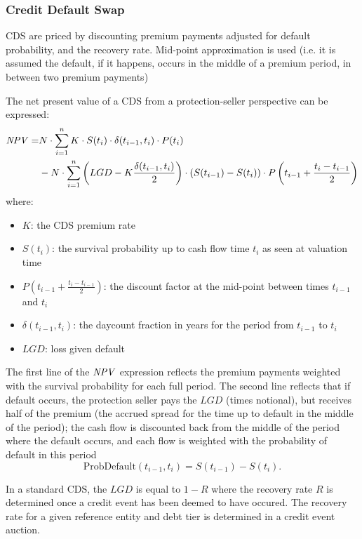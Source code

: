 \subsubsection{Credit Default Swap}
\label{pricing:cr_cds}

CDS are priced by discounting premium payments adjusted for default probability, 
and the recovery rate. Mid-point approximation is used (i.e. it is assumed the 
default, if it happens, occurs in the middle of a premium period, in between 
two premium payments)

The net present value of a CDS from a protection-seller perspective can be 
expressed:
\begin{align*}
\mathit{NPV}=& N \cdot\sum_{i=1}^n K\cdot S(t_i)\cdot\delta(t_{i-1},t_i)\cdot P(t_i)\\
&- N\cdot \sum_{i=1}^n \left(LGD - K \frac{\delta(t_{i-1}, t_i)}{2} \right)
\cdot (S(t_{i-1}) - S(t_i)) \cdot P\left(t_{i-1} + \frac{t_i-t_{i-1}}{2}\right)
\end{align*}
where:
\begin{itemize}
\item $K$: the CDS premium rate
\item $S(t_i)$: the survival probability  up to cash flow time $t_i$ as seen 
at valuation time 
\item $P\left(t_{i-1} + \frac{t_i-t_{i-1}}{2}\right)$: the discount factor at the mid-point 
between times $t_{i-1}$ and $t_i$
\item $\delta(t_{i-1},t_i)$: the daycount fraction in years for the period from 
$t_{i-1}$ to $t_i$
\item $LGD$: loss given default
\end{itemize}

The first line of the $\mathit{NPV}$ expression reflects the premium payments weighted 
with the survival probability for each full period. The second line reflects that 
if default occurs, the protection seller pays the $LGD$ (times notional), but receives 
half of the premium (the accrued spread for the time up to default in the middle 
of the period); the cash flow is discounted back from the middle of the period 
where the default occurs, and each flow is weighted with the probability of default 
in this period
$$
\mbox{ProbDefault}(t_{i-1},t_i) = S(t_{i-1}) - S(t_i).
$$

In a standard CDS, the $LGD$ is equal to $1-R$ where the recovery rate $R$ is 
determined once a credit event has been deemed to have occured. The recovery 
rate for a given reference entity and debt tier is determined in a credit event auction.

